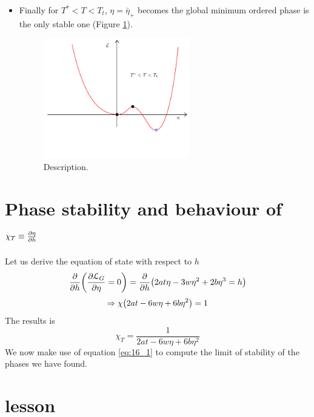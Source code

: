 \documentclass[../main/main.tex]{subfiles}
\begin{document}
\begin{itemize}
\begin{itemize}
\item Finally for \( T^* < T < T_t \), \( \eta = \bar{\eta }_+  \) becomes the global minimum ordered phase is the only stable one (Figure \ref{fig:16_5}).
\begin{figure}[h!]
\centering
\includegraphics[width=0.6\textwidth]{../lessons/16_image/5.pdf}
\caption{\label{fig:16_5} Description.}
\end{figure}
\end{itemize}
\end{itemize}


\section{Phase stability and behaviour of \( \chi _T \equiv \pdv{\eta }{h}  \)}

Let us derive the equation of state with respect to \( h \)
\begin{equation}
  \pdv{}{h} \qty(\pdv{\mathcal{L}_G}{\eta } = 0 )   = \pdv{}{h} \qty(2 a t \eta - 3 w \eta ^2 + 2 b \eta ^3 = h)
\end{equation}
\begin{equation}
  \Rightarrow \chi \qty(2 a t - 6 w \eta + 6 b \eta ^2 ) =1
\end{equation}
The results is
\begin{equation}
  \chi _T = \frac{1}{2 a t - 6 w \eta + 6 b \eta ^2}
  \label{eq:16_1}
\end{equation}
We now make use of equation \eqref{eq:16_1} to compute the limit of stability of the phases we have found. 


\section{lesson}
\end{document}
